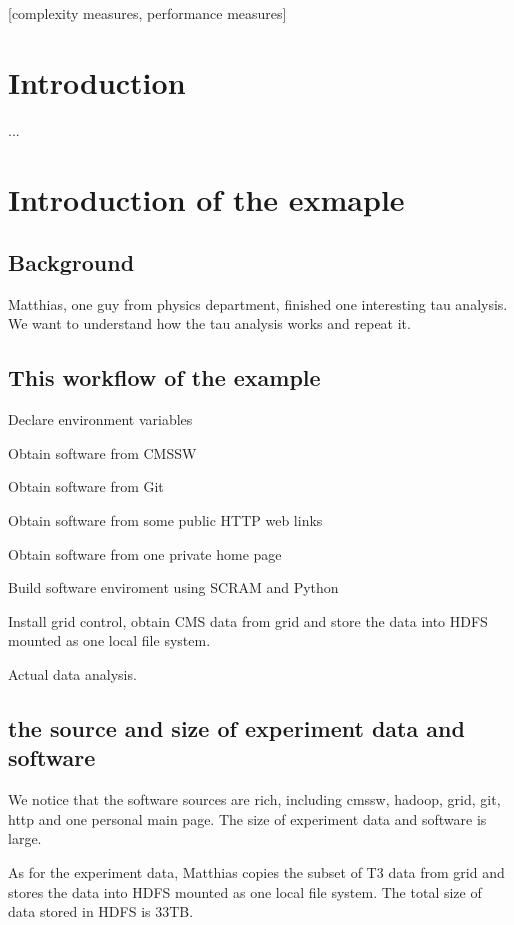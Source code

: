 \documentclass{acm_proc_article-sp}
\begin{document}
[complexity measures, performance measures]




\section{Introduction}
...
\section{Introduction of the exmaple}
\subsection{Background}
Matthias, one guy from physics department, finished one interesting tau analysis. We want to understand how the tau analysis works and repeat it. 

\subsection{This workflow of the example}
Declare environment variables

Obtain software from CMSSW

Obtain software from Git

Obtain software from some public HTTP web links

Obtain software from one private home page

Build software enviroment using SCRAM and Python

Install grid control, obtain CMS data from grid and store the data into HDFS mounted as one local file system.

Actual data analysis.

\subsection{the source and size of experiment data and software}
We notice that the software sources are rich, including cmssw, hadoop, grid, git, http and one personal main page. The size of experiment data and software is large.

As for the experiment data, Matthias copies the subset of T3 data from grid and stores the data into HDFS mounted as one local file system. The total size of data stored in HDFS is 33TB.
\end{document}
